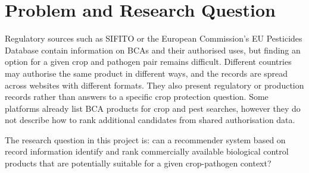 \section{Problem and Research Question}\label{sec:motivation-and-project-framing}

Regulatory sources such as SIFITO \cite{dgav-sifito} or the European Commission's EU Pesticides Database \cite{ec-pesticides-database} contain information on BCAs and their authorised uses, but finding an option for a given crop and pathogen pair remains difficult.
Different countries may authorise the same product in different ways, and the records are spread across websites with different formats.
They also present regulatory or production records rather than answers to a specific crop protection question.
Some platforms already list BCA products for crop and pest searches, however they do not describe how to rank additional candidates from shared authorisation data.

The research question in this project is: can a recommender system based on record information identify and rank commercially available biological control products that are potentially suitable for a given crop-pathogen context?
